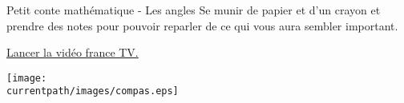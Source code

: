 \vfill

\vfill

\begin{center}
    \begin{myBox}{Petit conte mathématique - Les angles}
        Se munir de papier et d'un crayon et prendre des notes pour pouvoir reparler de ce qui vous aura sembler important.

        \bigskip
        
        \href{lozano.maths.free.fr/videos/LesAngles.mp4}{ Lancer la vidéo france TV.}
    \end{myBox}
\end{center}

\vfill

\begin{center}
    \texttt{[image: \\currentpath/images/compas.eps]}
\end{center}